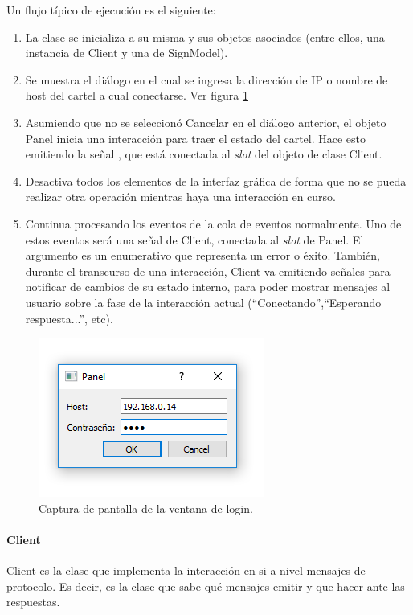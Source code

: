 Un flujo típico de ejecución es el siguiente:
\begin{enumerate}
	\item La clase se inicializa a su misma y sus objetos asociados (entre ellos, una instancia de Client y una de SignModel).
	\item Se muestra el diálogo en el cual se ingresa la dirección de IP o nombre de host del cartel a cual conectarse. Ver figura \ref{fig:login}
	\item Asumiendo que no se seleccionó Cancelar en el diálogo anterior, el objeto Panel inicia una interacción para traer el estado del cartel. Hace esto emitiendo la señal , que está conectada al \emph{slot}  del objeto de clase Client.
	\item Desactiva todos los elementos de la interfaz gráfica de forma que no se pueda realizar otra operación mientras haya una interacción en curso.
	\item Continua procesando los eventos de la cola de eventos normalmente. Uno de estos eventos será una señal  de Client, conectada al \emph{slot}  de Panel. El argumento es un enumerativo que representa un error o éxito. También, durante el transcurso de una interacción, Client va emitiendo señales para notificar de cambios de su estado interno, para poder mostrar mensajes al usuario sobre la fase de la interacción actual (\enquote{Conectando},\enquote{Esperando respuesta...}, etc).
\end{enumerate}

\begin{figure}[hbtp]
	\centering
	\includegraphics[scale=0.8]{imagenes/login.png}
	\caption{Captura de pantalla de la ventana de login.}
	\label{fig:login}
\end{figure}

\paragraph{Client}
Client es la clase que implementa la interacción en si a nivel mensajes de protocolo. Es decir, es la clase que sabe qué mensajes emitir y que hacer ante las respuestas.

